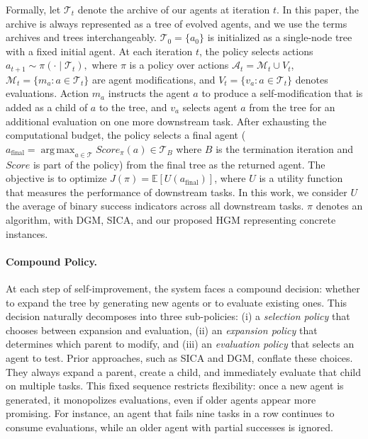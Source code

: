 \documentclass{article}
\newcommand{\E}{\mathbb{E}}
\DeclareMathOperator*{\argmax}{arg\,max}
\begin{document}
Formally, let $\mathcal{T}_t$ denote the archive of our agents at iteration $t$. In this paper, the archive is always represented as a tree of evolved agents, and we use the terms archives and trees interchangeably.  
$\mathcal{T}_0 = \{a_0\}$ is initialized as a single-node tree with a fixed initial agent.
At each iteration $t$, the policy selects actions $a_{t+1} \sim \pi(\cdot \mid \mathcal{T}_t),$ where $\pi$ is a policy over actions $\mathcal{A}_t = \mathcal{M}_t \cup V_t$, $\mathcal{M}_t = \{m_a : a\in \mathcal{T}_t\}$ are agent modifications, and  $V_t =\{v_a : a\in \mathcal{T}_t\}$ denotes evaluations. 
Action $m_a$ instructs the agent $a$ to produce a self-modification that is added as a child of $a$ to the tree, and $v_a$ selects agent $a$ from the tree for an additional evaluation on one more downstream task.
After exhausting the computational budget, the policy selects a final agent ($a_{\text{final}} = \argmax_{a\in \mathcal{T}}Score_\pi(a) \in \mathcal{T}_B$ where $B$ is the termination iteration and $Score$ is part of the policy) from the final tree as the returned agent.
The objective is to optimize $J(\pi) = \E[U(a_{\text{final}})]$, where $U$ is a utility function that measures the performance of downstream tasks.
In this work, we consider $U$ the average of binary success indicators across all downstream tasks. $\pi$ denotes an algorithm, with DGM, SICA, and our proposed HGM representing concrete instances.

\paragraph{Compound Policy.} At each step of self-improvement, the system faces a compound decision: whether to expand the tree by generating new agents or to evaluate existing ones. This decision naturally decomposes into three sub-policies: (i) a \emph{selection policy} that chooses between expansion and evaluation, (ii) an \emph{expansion policy} that determines which parent to modify, and (iii) an \emph{evaluation policy} that selects an agent to test.  Prior approaches, such as SICA and DGM, conflate these choices. They always expand a parent, create a child, and immediately evaluate that child on multiple tasks. This fixed sequence restricts flexibility: once a new agent is generated, it monopolizes evaluations, even if older agents appear more promising. For instance, an agent that fails nine tasks in a row continues to consume evaluations, while an older agent with partial successes is ignored.
\end{document}
